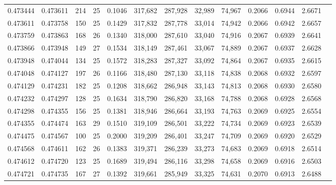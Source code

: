 \begin{tabular}{rrrrrrrrrrrrr}
0.473444 & 0.473611 & 214 &  25 &                                     0.1046 & 317,682 & 287,928 &  32,989 &  74,967 & 0.2066 & 0.6944 & 2.6671 \\
0.473611 & 0.473758 & 150 &  25 &                                     0.1429 & 317,832 & 287,778 &  33,014 &  74,942 & 0.2066 & 0.6942 & 2.6657 \\
0.473759 & 0.473863 & 168 &  26 &                                     0.1340 & 318,000 & 287,610 &  33,040 &  74,916 & 0.2067 & 0.6939 & 2.6641 \\
0.473866 & 0.473948 & 149 &  27 &                                     0.1534 & 318,149 & 287,461 &  33,067 &  74,889 & 0.2067 & 0.6937 & 2.6628 \\
0.473948 & 0.474044 & 134 &  25 &                                     0.1572 & 318,283 & 287,327 &  33,092 &  74,864 & 0.2067 & 0.6935 & 2.6615 \\
0.474048 & 0.474127 & 197 &  26 &                                     0.1166 & 318,480 & 287,130 &  33,118 &  74,838 & 0.2068 & 0.6932 & 2.6597 \\
0.474129 & 0.474231 & 182 &  25 &                                     0.1208 & 318,662 & 286,948 &  33,143 &  74,813 & 0.2068 & 0.6930 & 2.6580 \\
0.474232 & 0.474297 & 128 &  25 &                                     0.1634 & 318,790 & 286,820 &  33,168 &  74,788 & 0.2068 & 0.6928 & 2.6568 \\
0.474298 & 0.474355 & 156 &  25 &                                     0.1381 & 318,946 & 286,664 &  33,193 &  74,763 & 0.2069 & 0.6925 & 2.6554 \\
0.474355 & 0.474474 & 163 &  29 &                                     0.1510 & 319,109 & 286,501 &  33,222 &  74,734 & 0.2069 & 0.6923 & 2.6539 \\
0.474475 & 0.474567 & 100 &  25 &                                     0.2000 & 319,209 & 286,401 &  33,247 &  74,709 & 0.2069 & 0.6920 & 2.6529 \\
0.474568 & 0.474611 & 162 &  26 &                                     0.1383 & 319,371 & 286,239 &  33,273 &  74,683 & 0.2069 & 0.6918 & 2.6514 \\
0.474612 & 0.474720 & 123 &  25 &                                     0.1689 & 319,494 & 286,116 &  33,298 &  74,658 & 0.2069 & 0.6916 & 2.6503 \\
0.474721 & 0.474735 & 167 &  27 &                                     0.1392 & 319,661 & 285,949 &  33,325 &  74,631 & 0.2070 & 0.6913 & 2.6488 \\

\end{tabular}
